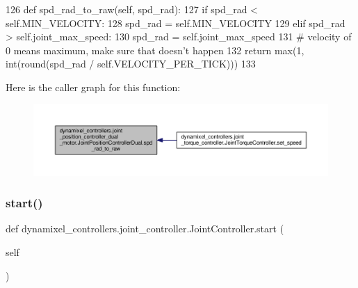 \begin{DoxyCode}
126     \textcolor{keyword}{def }spd\_rad\_to\_raw(self, spd\_rad):
127         \textcolor{keywordflow}{if} spd\_rad < self.MIN\_VELOCITY: 
128             spd\_rad = self.MIN\_VELOCITY
129         \textcolor{keywordflow}{elif} spd\_rad > self.joint\_max\_speed: 
130             spd\_rad = self.joint\_max\_speed
131         \textcolor{comment}{# velocity of 0 means maximum, make sure that doesn't happen}
132         \textcolor{keywordflow}{return} max(1, int(round(spd\_rad / self.VELOCITY\_PER\_TICK)))
133         
\end{DoxyCode}
Here is the caller graph for this function\+:
\nopagebreak
\begin{figure}[H]
\begin{center}
\leavevmode
\includegraphics[width=350pt]{d7/d04/classdynamixel__controllers_1_1joint__position__controller__dual__motor_1_1_joint_position_controller_dual_a5a96d3bd5d40feb12ffcb581d7acedc1_icgraph}
\end{center}
\end{figure}
\mbox{\label{classdynamixel__controllers_1_1joint__controller_1_1_joint_controller_a8da16a8b801f868a4de7c68d6adc851f}} 
\subsubsection{\texorpdfstring{start()}{start()}}
{\footnotesize\ttfamily def dynamixel\+\_\+controllers.\+joint\+\_\+controller.\+Joint\+Controller.\+start (\begin{DoxyParamCaption}\item[{}]{self }\end{DoxyParamCaption})\hspace{0.3cm}{\ttfamily [inherited]}}



